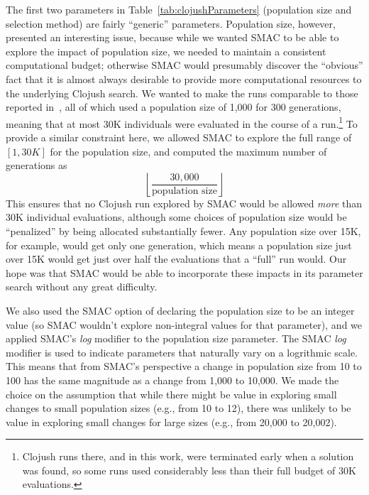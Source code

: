 The first two parameters in Table~\ref{tab:clojushParameters} (population size
and selection method) are fairly ``generic'' parameters. Population size, 
however, presented an interesting issue, because while we wanted SMAC to be able to
explore the impact of population size, we needed to maintain a consistent
computational budget; otherwise SMAC would presumably discover the ``obvious''
fact that it is almost always desirable to provide more computational resources to the underlying Clojush search. We wanted to make the runs comparable to those
reported in~\cite{Helmuth:2015:GECCO}, all of which used a population size of
1,000 for 300 generations, meaning that at most 30K individuals were evaluated 
in the course of a run.\footnote{Clojush runs there, and in this work, 
	were terminated early when a solution was found, so some runs used
	considerably less than their full budget of 30K evaluations.} To provide
a similar constraint here, we allowed SMAC to explore the full range of 
$[1, 30K]$ for the population size, and computed the maximum number of
generations as
\[
	\left \lfloor{\frac{30,000}{\textrm{population size}}}\right \rfloor
\]
This ensures that no Clojush run explored by SMAC would be allowed 
\emph{more} than 30K individual evaluations, although some choices of 
population size would be ``penalized'' by being allocated substantially fewer. 
Any population size over 15K, for example, would get only one generation, which 
means a population size just over 15K would get just over half the evaluations 
that a ``full'' run would. Our hope was that SMAC would be able to incorporate
these impacts in its parameter search without any great difficulty.

We also used the SMAC option of declaring the population size to be an
integer value (so SMAC wouldn't explore non-integral values for that parameter),
and we applied SMAC's \emph{log} modifier to the population size parameter.
The SMAC \emph{log} modifier is used to indicate parameters that naturally
vary on a logrithmic scale. This means that from SMAC's perspective a change
in population size from 10 to 100 has the same magnitude as a change from 1,000 to
10,000. We made the choice on the assumption that while there might be value
in exploring small changes to small population sizes (e.g., from 10 to 12),
there was unlikely to be value in exploring small changes for large sizes
(e.g., from 20,000 to 20,002).

